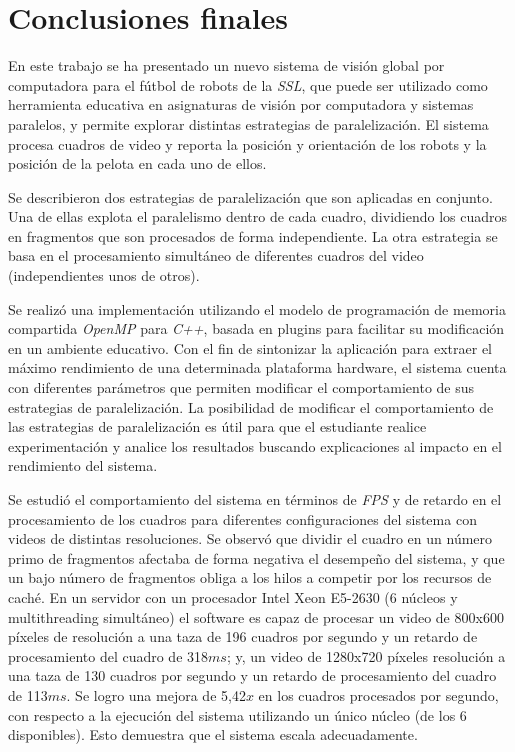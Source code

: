 
\section{Conclusiones finales}

\label{concluciones}

En este trabajo se ha presentado un nuevo sistema de visión global por
computadora para el fútbol de robots de la \emph{SSL}, que puede ser utilizado
como herramienta educativa en asignaturas de visión por computadora y sistemas
paralelos, y permite explorar distintas estrategias de paralelización. El
sistema procesa cuadros de video y reporta la posición y orientación de los
robots y la posición de la pelota en cada uno de ellos.

Se describieron dos estrategias de paralelización que son aplicadas en conjunto.
Una de ellas explota el paralelismo dentro de cada cuadro, dividiendo los
cuadros en fragmentos que son procesados de forma independiente. La otra
estrategia se basa en el procesamiento simultáneo de diferentes cuadros del
video (independientes unos de otros).

Se realizó una implementación utilizando el modelo de programación de memoria
compartida \emph{OpenMP} para \emph{C++}, basada en plugins para facilitar su
modificación en un ambiente educativo. Con el fin de sintonizar la aplicación
para extraer el máximo rendimiento de una determinada plataforma hardware, el
sistema cuenta con diferentes parámetros que permiten modificar el
comportamiento de sus estrategias de paralelización. La posibilidad de modificar
el comportamiento de las estrategias de paralelización es útil para que el
estudiante realice experimentación y analice los resultados buscando
explicaciones al impacto en el rendimiento del sistema.

Se estudió el comportamiento del sistema en términos de \emph{FPS} y de retardo
en el procesamiento de los cuadros para diferentes configuraciones del sistema
con videos de distintas resoluciones. Se observó que dividir el cuadro
en un número primo de fragmentos afectaba de forma negativa el desempeño del
sistema, y que un bajo número de fragmentos obliga a los hilos a competir por
los recursos de caché. En un servidor con un procesador Intel Xeon E5-2630 (6
núcleos y multithreading simultáneo) el software es capaz de procesar un video
de 800x600 píxeles de resolución a una taza de 196 cuadros por segundo y un
retardo de procesamiento del cuadro de 318$ms$; y, un video de 1280x720 píxeles
resolución a una taza de 130 cuadros por segundo y un retardo de procesamiento
del cuadro de 113$ms$. Se logro una mejora de 5,42$x$ en los cuadros procesados
por segundo, con respecto a la ejecución del sistema utilizando un único núcleo
(de los 6 disponibles). Esto demuestra que el sistema escala adecuadamente.

